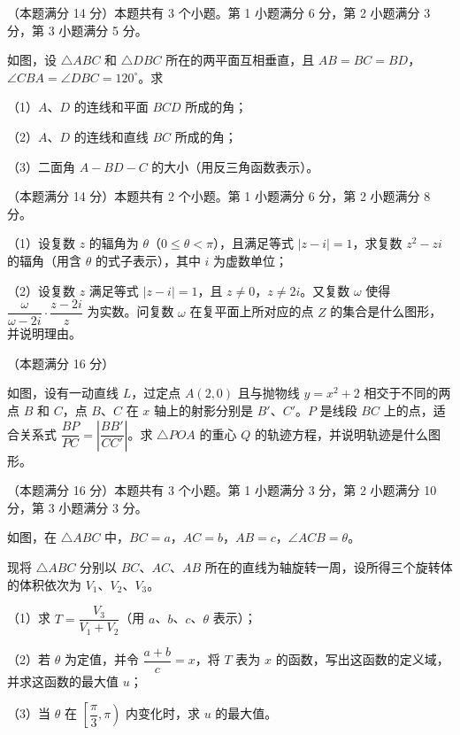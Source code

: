 \Needspace{0.4\textheight}
\begin{question}
（本题满分 14 分）本题共有 3 个小题。第 1 小题满分 6 分，第 2 小题满分 3 分，第 3 小题满分 5 分。

如图，设 $\triangle ABC$ 和 $\triangle DBC$ 所在的两平面互相垂直，且 $AB=BC=BD$，$\angle CBA=\angle DBC=120^{\circ}$。求

（1）$A$、$D$ 的连线和平面 $BCD$ 所成的角；

（2）$A$、$D$ 的连线和直线 $BC$ 所成的角；

（3）二面角 $A-BD-C$ 的大小（用反三角函数表示）。
\nopagebreak[4]
\begin{center}\end{center}
\nopagebreak[4]
\end{question}
\begin{question}
（本题满分 14 分）本题共有 2 个小题。第 1 小题满分 6 分，第 2 小题满分 8 分。

（1）设复数 $z$ 的辐角为 $\theta$（$0\le\theta<\pi$），且满足等式 $|z-i|=1$，求复数 $z^{2}-zi$ 的辐角（用含 $\theta$ 的式子表示），其中 $i$ 为虚数单位；

（2）设复数 $z$ 满足等式 $|z-i|=1$，且 $z\ne 0$，$z\ne 2i$。又复数 $\omega$ 使得 $\dfrac{\omega}{\omega-2i}\cdot\dfrac{z-2i}{z}$ 为实数。问复数 $\omega$ 在复平面上所对应的点 $Z$ 的集合是什么图形，并说明理由。

\Needspace{0.4\textheight}
\end{question}
\begin{question}
（本题满分 16 分）

如图，设有一动直线 $L$，过定点 $A(2,0)$ 且与抛物线 $y=x^{2}+2$ 相交于不同的两点 $B$ 和 $C$，点 $B$、$C$ 在 $x$ 轴上的射影分别是 $B'$、$C'$。$P$ 是线段 $BC$ 上的点，适合关系式 $\dfrac{BP}{PC}=\left|\dfrac{BB'}{CC'}\right|$。求 $\triangle POA$ 的重心 $Q$ 的轨迹方程，并说明轨迹是什么图形。
\nopagebreak[4]
\begin{center}\end{center}
\nopagebreak[4]
\Needspace{0.4\textheight}
\end{question}
\begin{question}
（本题满分 16 分）本题共有 3 个小题。第 1 小题满分 3 分，第 2 小题满分 10 分，第 3 小题满分 3 分。

如图，在 $\triangle ABC$ 中，$BC=a$，$AC=b$，$AB=c$，$\angle ACB=\theta$。
\nopagebreak[4]
\begin{center}\end{center}
\nopagebreak[4]
现将 $\triangle ABC$ 分别以 $BC$、$AC$、$AB$ 所在的直线为轴旋转一周，设所得三个旋转体的体积依次为 $V_{1}$、$V_{2}$、$V_{3}$。

（1）求 $T=\dfrac{V_{3}}{V_{1}+V_{2}}$（用 $a$、$b$、$c$、$\theta$ 表示）；

（2）若 $\theta$ 为定值，并令 $\dfrac{a+b}{c}=x$，将 $T$ 表为 $x$ 的函数，写出这函数的定义域，并求这函数的最大值 $u$；

（3）当 $\theta$ 在 $\left[\dfrac{\pi}{3},\pi\right)$ 内变化时，求 $u$ 的最大值。

\end{question}